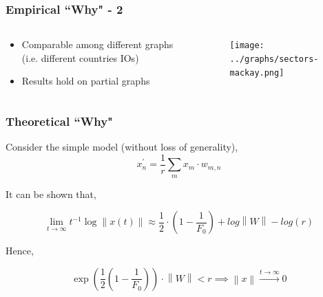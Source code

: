 \documentclass{beamer}
\newcommand{\norm}[1]{\left\lVert#1\right\rVert}
\begin{document}
\begin{frame}
    \frametitle{Empirical ``Why" - 2}
    \begin{columns}
        \begin{column}{.3\textwidth}
            \begin{itemize}
                \item Comparable among different graphs (i.e. different countries IOs)
                \item Results hold on partial graphs
            \end{itemize}
        \end{column}
        \begin{column}{.69\textwidth}
            \begin{figure}
                \texttt{[image: ../graphs/sectors-mackay.png]}
            \end{figure}
        \end{column}
    \end{columns}
\end{frame}

\begin{frame}
    \frametitle{Theoretical ``Why"}
    Consider the simple model (without loss of generality),
    \begin{equation*}
        x_n^\prime =\frac{1}{r} \sum_{m} x_m\cdot w_{m, n}
    \end{equation*}

    It can be shown that,

    \begin{equation*}
        \lim_{t \xrightarrow{} \infty} t^{-1} \log \norm{x(t)} \approx\frac{1}{2} \cdot \left( 1 - \frac{1}{F_0}\right) + log \norm{W} - log(r)
    \end{equation*}

    Hence,

    \begin{equation}
        \exp\left(\frac{1}{2} \left( 1 - \frac{1}{F_0}\right) \right) \cdot \norm{W} < r \implies \norm{x} \xrightarrow{t\xrightarrow{} \infty} 0
    \end{equation}

\end{frame}
\end{document}
